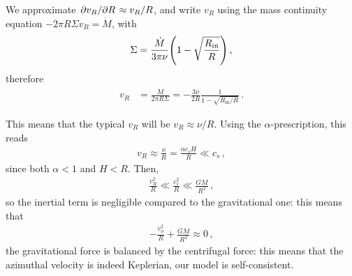 \documentclass[main.tex]{subfiles}
\begin{document}
We approximate \(\pdv*{v_R}{R} \approx v_R / R\), and write \(v_R\) using the mass continuity equation \(-2 \pi R \Sigma v_R = \dot{M}\), with 
%
\begin{align}
\Sigma = \frac{\dot{M}}{3 \pi \nu } \qty(1 - \sqrt{\frac{R _{\text{in}}}{R}})
\,,
\end{align}
%
therefore 
%
\begin{align}
v_R &= \frac{\dot{M}}{2 \pi R \Sigma } = - \frac{3 \nu }{2 R} \frac{1}{1 - \sqrt{R _{\text{in}} / R}}
\,.
\end{align}

This means that the typical \(v_R\) will be \(v_R \approx \nu /R\). 
Using the \(\alpha \)-prescription, this reads 
%
\begin{align}
v_R \approx \frac{\nu}{R} = \frac{\alpha c_s H}{R} \ll c_s 
\,,
\end{align}
%
since both \(\alpha < 1\) and \(H < R\).
Then, 
%
\begin{align}
\frac{v_R^2}{R} \ll \frac{c_s^2}{R} \ll \frac{GM}{R^2}
\,,
\end{align}
%
so  the inertial term is negligible compared to the gravitational one: this means that 
%
\begin{align}
- \frac{v_\phi^2}{R} + \frac{GM}{R^2} \approx 0
\,,
\end{align}
%
the gravitational force is balanced by the centrifugal force: this means that the azimuthal velocity is indeed Keplerian, our model is self-consistent. 
\end{document}
